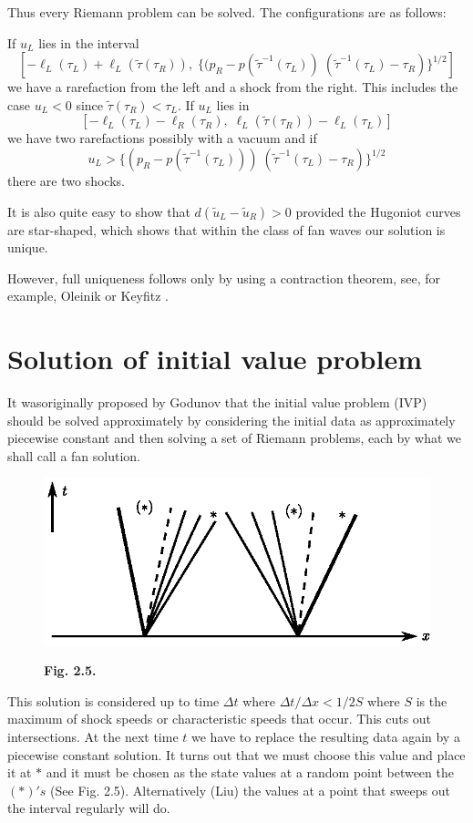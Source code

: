 Thus every Riemann problem can be solved. The configurations are as follows:

If $u_L$ lies in the interval
$$
[-\ell_L(\tau_L) + \ell_L (\tilde{\tau} (\tau_R)), \; \{(p_R - p (\tilde{\tau}^{-1} (\tau_L)) \; (\tilde{\tau}^{-1} (\tau_L) - \tau_R)\}^{1/2}]
$$
we have a rarefaction from the left and a shock from the right. This includes the case $u_L < 0$ since $\tilde{\tau}(\tau_R) < \tau_L$. If $u_L$ lies in 
$$
[-\ell_L(\tau_L) - \ell_R (\tau_R), \; \ell_L(\tilde{\tau}(\tau_R)) - \ell_L(\tau_L)] 
$$
we have two rarefactions possibly with a vacuum and if 
$$
u_L > \{(p_R - p (\tilde{\tau}^{-1} (\tau_L))) \; (\tilde{\tau}^{-1} (\tau_L) - \tau_R)\}^{1/2} 
$$
there are two shocks.

It is also quite easy to show that $d(\tilde{u}_L - \tilde{u}_R) >0$ provided the Hugoniot curves are star-shaped, which shows that within the class of fan waves our solution is unique.

However, full uniqueness follows only by using a contraction theorem, see, for example, Oleinik \cite{key34} or Keyfitz \cite{key20}.

\section{Solution of initial value problem}\label{chap2:sec2.9}
It was\pageoriginale originally proposed by Godunov that the initial value problem (IVP) should be solved approximately by considering the initial data as approximately piecewise constant and then solving a set of Riemann problems, each by what we shall call a fan solution.
\begin{figure}[H]
\centering
\includegraphics{figures/fig2.5.eps}
\centerline{\bf Fig. 2.5.}
\end{figure}

This solution is considered up to time $\Delta t$ where $\Delta t / \Delta x < 1/2 S$ where $S$ is the maximum of shock speeds or characteristic speeds that occur. This cuts out intersections. At the next time $t$ we have to replace the resulting data again by a piecewise constant solution. It turns out that we must choose this value and place it at $*$ and it must be chosen as the state values at a random point between the $(*)'s$ (See Fig. 2.5). Alternatively (Liu) the values at a point that sweeps out the interval regularly will do.

